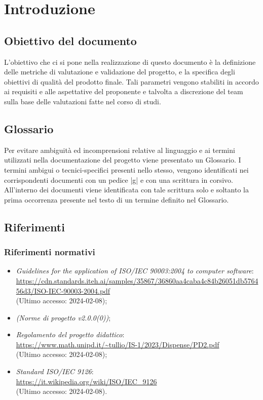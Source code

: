 \documentclass[10pt, a4paper]{article}
\title{\titolo}
\author{SWEetCode}
\begin{document}



\newpage

\tableofcontents
\newpage
\listoffigures
\newpage
\listoftables
\newpage

\section{Introduzione}
\subsection{Obiettivo del documento}
L'obiettivo che ci si pone nella realizzazione di questo documento è la definizione delle metriche di valutazione e validazione del progetto, e la specifica degli obiettivi di qualità del prodotto finale. Tali parametri vengono stabiliti in accordo ai requisiti e 
alle aspettative del proponente e talvolta a discrezione del team sulla base delle valutazioni fatte nel corso di studi.

\subsection{Glossario}
Per evitare ambiguità ed incomprensioni relative al linguaggio e ai termini utilizzati nella documentazione del progetto viene presentato un Glossario.
I termini ambigui o tecnici-specifici presenti nello stesso, vengono identificati nei corrispondenti documenti con un pedice |g| e con una scrittura in corsivo.
All'interno dei documenti viene identificata con tale scrittura solo e soltanto la prima occorrenza presente nel testo di un termine definito nel Glossario.

\subsection{Riferimenti}
   \subsubsection{Riferimenti normativi}
   \begin{itemize}
    \item \textit{Guidelines for the application of ISO/IEC 90003:2004 to computer software}: \\
        \url{https://cdn.standards.iteh.ai/samples/35867/36860aa4caba4c84b26051db576456d3/ISO-IEC-90003-2004.pdf}\\
        (Ultimo accesso: 2024-02-08);
    \item \textit{(Norme di progetto v2.0.0(0))};
    \item \textit{Regolamento del progetto didattico}: \\
        \url{https://www.math.unipd.it/~tullio/IS-1/2023/Dispense/PD2.pdf}\\
        (Ultimo accesso: 2024-02-08);
    \item \textit{Standard ISO/IEC 9126}:\\
        \url{https://it.wikipedia.org/wiki/ISO/IEC_9126}\\
        (Ultimo accesso: 2024-02-08).
    \end{itemize}
    
\end{document}
